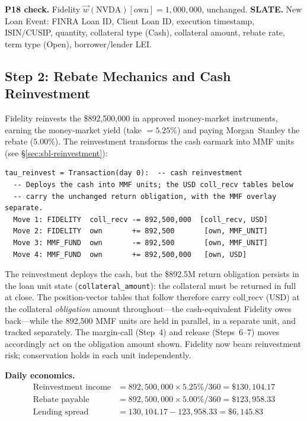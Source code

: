 \noindent\textbf{P18 check.} Fidelity $\vec{w}(\text{NVDA})[\mathrm{own}] = 1{,}000{,}000$, unchanged. \checkmark\quad
\textbf{SLATE.} New Loan Event: FINRA Loan ID, Client Loan ID, execution timestamp, ISIN/CUSIP, quantity, collateral type (Cash), collateral amount, rebate rate, term type (Open), borrower/lender LEI.

\subsection{Step 2: Rebate Mechanics and Cash Reinvestment}
\label{sec:us-step2}

Fidelity reinvests the \$892{,}500{,}000 in approved money-market instruments, earning the money-market yield (take $= 5.25\%$) and paying Morgan~Stanley the rebate ($5.00\%$). The reinvestment transforms the cash earmark into MMF units (see \S\ref{sec:sbl-reinvestment}):

\begin{lstlisting}
tau_reinvest = Transaction(day 0):  -- cash reinvestment
  -- Deploys the cash into MMF units; the USD coll_recv tables below
  -- carry the unchanged return obligation, with the MMF overlay separate.
  Move 1: FIDELITY  coll_recv -= 892,500,000  [coll_recv, USD]
  Move 2: FIDELITY  own       += 892,500       [own, MMF_UNIT]
  Move 3: MMF_FUND  own       -= 892,500       [own, MMF_UNIT]
  Move 4: MMF_FUND  own       += 892,500,000   [own, USD]
\end{lstlisting}

\noindent The reinvestment deploys the cash, but the \$892.5M return obligation persists in the loan unit state (\texttt{collateral\_amount}): the collateral must be returned in full at close. The position-vector tables that follow therefore carry $\mathrm{coll\_recv}$ (USD) at the collateral \emph{obligation} amount throughout---the cash-equivalent Fidelity owes back---while the 892{,}500 MMF units are held in parallel, in a separate unit, and tracked separately. The margin-call (Step~4) and release (Steps~6--7) moves accordingly act on the obligation amount shown. Fidelity now bears reinvestment risk; conservation holds in each unit independently.

\medskip
\noindent\textbf{Daily economics.}
\begin{align*}
\text{Reinvestment income} &= 892{,}500{,}000 \times 5.25\% / 360 = \$130{,}104.17 \\
\text{Rebate payable} &= 892{,}500{,}000 \times 5.00\% / 360 = \$123{,}958.33 \\
\text{Lending spread} &= 130{,}104.17 - 123{,}958.33 = \$6{,}145.83
\end{align*}

